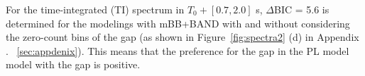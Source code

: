 \documentclass[linenumbers,twocolumn]{aastex631}
\providecommand{\DIFaddtex}[1]{{\protect\color{blue} \sf #1}} %
\providecommand{\DIFdeltex}[1]{{\protect\color{red} \scriptsize #1}} %
\providecommand{\DIFaddbegin}{} %
\providecommand{\DIFaddend}{} %
\providecommand{\DIFdelbegin}{} %
\providecommand{\DIFdelend}{} %
\providecommand{\DIFadd}[1]{\texorpdfstring{\DIFaddtex{#1}}{#1}} %
\providecommand{\DIFdel}[1]{\texorpdfstring{\DIFdeltex{#1}}{}} %
\begin{document}
  For the time-integrated (TI) spectrum in $T_0+[0.7,2.0]$ s, $\Delta$BIC = 5.6 is determined for the modelings with mBB+BAND with and without considering the zero-count bins of the gap (as shown in Figure~\ref{fig:spectra2} (d) in Appendix\DIFdelbegin \DIFdel{.}\DIFdelend \DIFaddbegin \DIFadd{~}\DIFaddend \ref{sec:appdenix}). This means that the preference for the \DIFdelbegin \DIFdel{gap in the PL model }\DIFdelend \DIFaddbegin \DIFadd{model with the gap }\DIFaddend is positive.%
\end{document}
